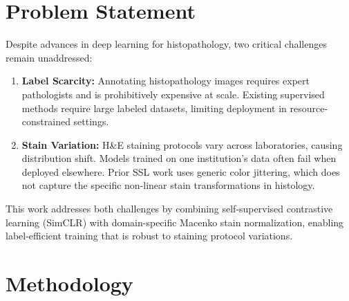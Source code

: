 \documentclass[conference]{IEEEtran}
\begin{document}
\begin{table}[htbp]
\centering
\caption{Comparison of Related Works (2023--2025)}
\label{tab:related_work}
\end{table}

\section{Problem Statement}
Despite advances in deep learning for histopathology, two critical challenges remain unaddressed:

\begin{enumerate}
\item \textbf{Label Scarcity:} Annotating histopathology images requires expert pathologists and is prohibitively expensive at scale. Existing supervised methods \cite{sail2023} require large labeled datasets, limiting deployment in resource-constrained settings.

\item \textbf{Stain Variation:} H\&E staining protocols vary across laboratories, causing distribution shift. Models trained on one institution's data often fail when deployed elsewhere. Prior SSL work \cite{persis2025} uses generic color jittering, which does not capture the specific non-linear stain transformations in histology.
\end{enumerate}

This work addresses both challenges by combining self-supervised contrastive learning (SimCLR) with domain-specific Macenko stain normalization, enabling label-efficient training that is robust to staining protocol variations.

\section{Methodology}
\end{document}
